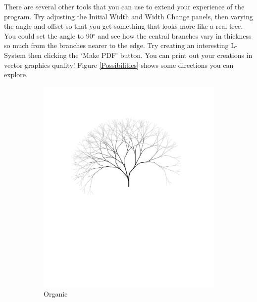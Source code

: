 \documentclass[12pt,twoside]{reedthesis}
\begin{document}
	There are several other tools that you can use to extend your experience of the program. Try adjusting the Initial Width and Width Change panels, then varying the angle and offset so that you get something that looks more like a real tree. You could set the angle to 90$^{\circ}$ and see how the central branches vary in thickness so much from the branches nearer to the edge. Try creating an interesting L-System then clicking the `Make PDF' button. You can print out your creations in vector graphics quality! Figure \ref{Possibilities} shows some directions you can explore.
	
	\clearpage
	\begin{figure}[h]
	\begin{subfigure}{0.5\textwidth}
		\centering
		\includegraphics[clip=true, viewport=1.5in 4.5in 8.5in 11in, height = 0.9\textwidth]{Images/HowToExplore5A}
		\caption{Organic\footnotemark}
		\label {HowToExplore5A}
	\end{subfigure}%
	\begin{subfigure}{0.5\textwidth}
		\centering

\end{subfigure}
\end{figure}
\end{document}
